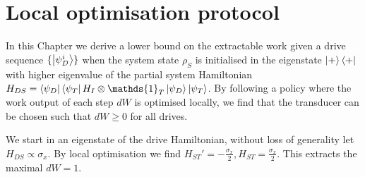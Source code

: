 \section{Local optimisation protocol}
In this Chapter we derive a lower bound on the extractable work given a drive sequence $\{\ket{\psi_D^i}\}$ when the system state $\rho_S$ is initialised in the eigenstate $\ket{+}\bra{+}$ with higher eigenvalue of the partial system Hamiltonian $H_{DS} = \bra{\psi_D}\bra{\psi_T} H_I \otimes \mathds{1}_T \ket{\psi_D} \ket{\psi_T}$.
By following a policy where the work output of each step $dW$ is optimised locally, we find that the transducer can be chosen such that $dW \geq 0$ for all drives.

We start in an eigenstate of the drive Hamiltonian, without loss of generality let $H_{DS} \propto \sigma_x$.
By local optimisation we find $H_{ST}' = -\frac{\sigma_x}{2}, H_{ST} = \frac{\sigma_x}{2}$.
This extracts the maximal $dW = 1$.

